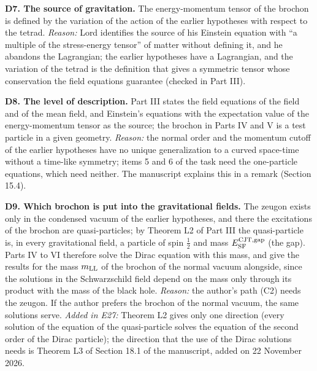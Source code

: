 \documentclass[
  10pt,
]{article}
\begin{document}
\textbf{D7. The source of gravitation.} The energy-momentum tensor of
the brochon is defined by the variation of the action of the earlier
hypotheses with respect to the tetrad. \emph{Reason:} Lord identifies
the source of his Einstein equation with ``a multiple of the
stress-energy tensor'' of matter without defining it, and he abandons
the Lagrangian; the earlier hypotheses have a Lagrangian, and the
variation of the tetrad is the definition that gives a symmetric tensor
whose conservation the field equations guarantee (checked in Part III).

\textbf{D8. The level of description.} Part III states the field
equations of the field and of the mean field, and Einstein's equations
with the expectation value of the energy-momentum tensor as the source;
the brochon in Parts IV and V is a test particle in a given geometry.
\emph{Reason:} the normal order and the momentum cutoff of the earlier
hypotheses have no unique generalization to a curved space-time without
a time-like symmetry; items 5 and 6 of the task need the one-particle
equations, which need neither. The manuscript explains this in a remark
(Section 15.4).

\textbf{D9. Which brochon is put into the gravitational fields.} The
zeugon exists only in the condensed vacuum of the earlier hypotheses,
and there the excitations of the brochon are quasi-particles; by Theorem
L2 of Part III the quasi-particle is, in every gravitational field, a
particle of spin \(\tfrac12\) and mass \(E^{\rm CJT,gap}_{\rm SF}\) (the
gap). Parts IV to VI therefore solve the Dirac equation with this mass,
and give the results for the mass \(m_{\rm LL}\) of the brochon of the
normal vacuum alongside, since the solutions in the Schwarzschild field
depend on the mass only through its product with the mass of the black
hole. \emph{Reason:} the author's path (C2) needs the zeugon. If the
author prefers the brochon of the normal vacuum, the same solutions
serve. \emph{Added in E27:} Theorem L2 gives only one direction (every
solution of the equation of the quasi-particle solves the equation of
the second order of the Dirac particle); the direction that the use of
the Dirac solutions needs is Theorem L3 of Section 18.1 of the
manuscript, added on 22 November 2026.
\end{document}

